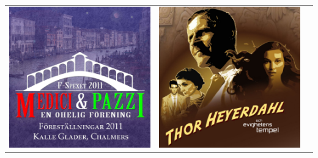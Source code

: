 \begin{tabular}{c c c}
\includegraphics[width=\gamlaAffischerLength]{Bilder/TidigareSpexloggor/MediciIcon} &
\includegraphics[width=\gamlaAffischerLength]{Bilder/TidigareSpexloggor/ThorIcon}&

\end{tabular}
